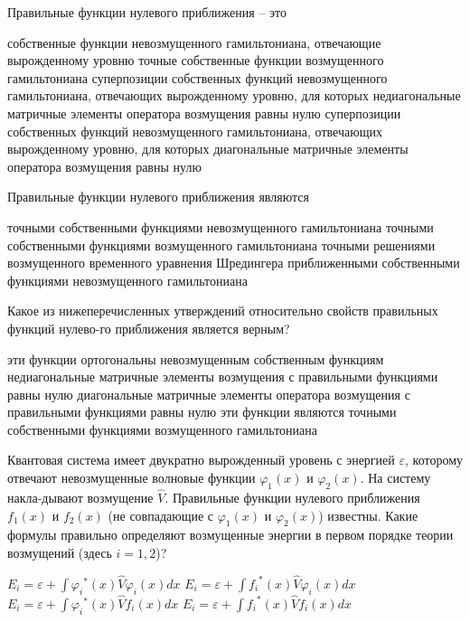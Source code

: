 \documentclass[11pt,a4paper]{exam}
\begin{document}
\begin{questions}

\question Правильные функции нулевого приближения – это 
\begin{choices}
\choice собственные функции невозмущенного гамильтониана, отвечающие вырожденному уровню
\choice точные собственные функции возмущенного гамильтониана 
\choice суперпозиции собственных функций невозмущенного гамильтониана, отвечающих вырожденному уровню, для которых недиагональные матричные элементы оператора возмущения равны нулю 
\choice суперпозиции собственных функций невозмущенного гамильтониана, отвечающих вырожденному уровню, для которых диагональные матричные элементы оператора возмущения равны нулю
\end{choices}

\question Правильные функции нулевого приближения являются
\begin{choices}
\choice точными собственными функциями невозмущенного гамильтониана
\choice точными собственными функциями возмущенного гамильтониана
\choice точными решениями возмущенного временного уравнения Шредингера
\choice приближенными собственными функциями невозмущенного гамильтониана
\end{choices}

\question Какое из нижеперечисленных утверждений относительно свойств правильных функций нулево-го приближения является верным?
\begin{choices}
\choice эти функции ортогональны невозмущенным собственным функциям
\choice недиагональные матричные элементы возмущения с правильными функциями равны нулю
\choice диагональные матричные элементы оператора возмущения с правильными функциями равны нулю
\choice эти функции являются точными собственными функциями возмущенного гамильтониана
\end{choices}

\question Квантовая система имеет двукратно вырожденный уровень с энергией $\varepsilon $, которому отвечают невозмущенные волновые функции ${\varphi _1}(x)$ и ${\varphi _2}(x)$. На систему накла-дывают возмущение $\hat V$. Правильные функции нулевого приближения ${f_1}(x)$ и ${f_2}(x)$ (не совпадающие с ${\varphi _1}(x)$ и ${\varphi _2}(x)$) известны. Какие формулы правильно определяют возмущенные энергии в первом порядке теории возмущений (здесь $i = 1,2$)?
\begin{choices}
\choice ${E_i} = \varepsilon  + \int {{\varphi _i}^*(x)\hat V} {\varphi _i}(x)dx$        
\choice ${E_i} = \varepsilon  + \int {{f_i}^*(x)\hat V} {\varphi _i}(x)dx$ 
\choice ${E_i} = \varepsilon  + \int {{\varphi _i}^*(x)\hat V} {f_i}(x)dx$         
\choice ${E_i} = \varepsilon  + \int {{f_i}^*(x)\hat V} {f_i}(x)dx$ 
\end{choices}


\end{questions}
\end{document}
